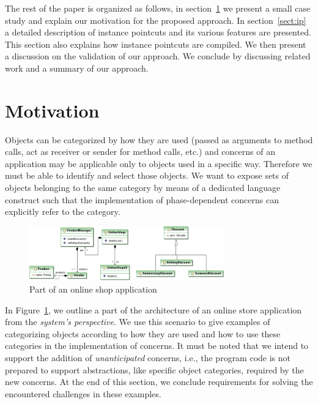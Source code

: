The rest of the paper is organized as follows, in section~\ref{sect:motivation} we present a small case study and explain our motivation for the proposed approach. In section~\ref{sect:ip} a detailed description of instance pointcuts and its various features are presented. This section also explains how instance pointcuts are compiled. We then present a discussion on the validation of our approach. We conclude by discussing related work and a summary of our approach.


\section{Motivation}
\label{sect:motivation}

Objects can be categorized by how they are used (passed as arguments to method calls, act as receiver or sender for method calls, etc.) and concerns of an application may be applicable only to objects used in a specific way.
Therefore we must be able to identify and select those objects.
We want to expose sets of objects belonging to the same category by means of a dedicated language construct such that the implementation of phase-dependent concerns can explicitly refer to the category.

\begin{figure}
\centering
\includegraphics[width= 0.75\textwidth]{images/onlineshop2.png}%
\vspace{10pt}
\caption{Part of an online shop application}%
\label{fig:shop}%
\end{figure}

In Figure~\ref{fig:shop}, we outline a part of the architecture of an online store application from the \emph{system's perspective}. We use this scenario to give examples of categorizing objects according to how they are used and how to use these categories in the implementation of concerns. It must be noted that we intend to support the addition of \emph{unanticipated} concerns, i.e., the program code is not prepared to support abstractions, like specific object categories, required by the new concerns.
At the end of this section, we conclude requirements for solving the encountered challenges in these examples.

